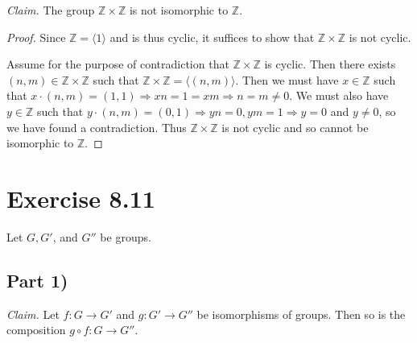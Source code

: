 \documentclass{abrice}
\newcommand{\Z}{\mathbb{Z}}
\newcommand{\Claim}{\noindent\emph{Claim.}\xspace}%
\begin{document}
\Claim The group $\Z \times \Z$ is not isomorphic to $\Z$.

\begin{proof}
  Since $\Z = \langle 1 \rangle$ and is thus cyclic, it suffices to show that
  $\Z \times \Z$ is not cyclic.

  Assume for the purpose of contradiction that $\Z \times \Z$ is cyclic. Then
  there exists $(n,m) \in \Z \times \Z$ such that $\Z \times \Z = \langle (n,m) \rangle$.
  Then we must have $x \in \Z$ such that $x \cdot (n,m) = (1,1) \Rightarrow xn =
  1 = xm \Rightarrow n = m \neq 0$. We must also have $y \in \Z$ such that $y
  \cdot (n,m) = (0,1) \Rightarrow yn = 0, ym = 1 \Rightarrow y = 0$ and $y \neq
  0$, so we have found a contradiction. Thus $\Z \times \Z$ is not cyclic and so
  cannot be isomorphic to $\Z$.
\end{proof}

\section{Exercise 8.11}

Let $G, G'$, and $G''$ be groups.

\subsection{Part 1)}

\Claim Let $f : G \to G'$ and $g : G' \to G''$ be isomorphisms of groups. Then
so is the composition $g \circ f : G \to G''$.
\end{document}
